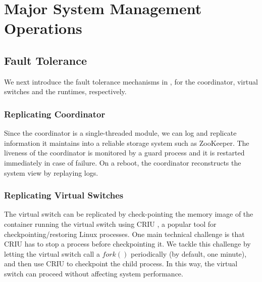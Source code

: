 \section{Major System Management Operations}
\label{sec:management}

\subsection{Fault Tolerance}
\label{sec:resilience}

We next introduce the fault tolerance mechanisms in \nfactor, for the coordinator, virtual switches and the runtimes, respectively.

\subsubsection{Replicating Coordinator}

Since the coordinator is a single-threaded module, %
we can log and replicate information it maintains into a reliable storage system such as ZooKeeper\cite{hunt2010zookeeper}. The liveness of the coordinator is monitored by a guard process and it is restarted immediately in case of failure. On a reboot, the coordinator reconstructs the system view by replaying logs.

\subsubsection{Replicating Virtual Switches}

The virtual switch can be replicated by
check-pointing the memory image of the container running the virtual switch using CRIU
\cite{criu}, a popular tool for checkpointing/restoring Linux processes. One main technical challenge is that CRIU has to stop a process before checkpointing it. %
 We tackle this challenge by letting the virtual switch call a $fork()$ periodically (by default, one minute), and then use CRIU to checkpoint
the child process. In this way, the virtual switch can proceed without affecting system performance.


